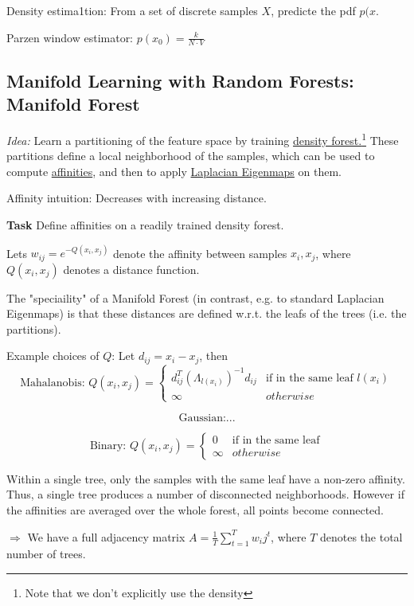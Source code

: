 \documentclass{scrartcl}
\begin{document}
\bigbreak

Density estima1tion: From a set of discrete samples \(X\), predicte the pdf \(p(x\).

Parzen window estimator: \(p(x_0) = \frac{k}{N \cdot V}\)

\subsection{Manifold Learning with Random Forests: Manifold Forest}
\textit{Idea:} Learn a partitioning of the feature space by training \underline{density forest.}\footnote{Note that we don't explicitly use the density} These partitions define a local neighborhood of the samples, which can be used to compute \underline{affinities}, and then to apply \underline{Laplacian Eigenmaps} on them.

Affinity intuition: Decreases with increasing distance.

\bigbreak

\textbf{Task} Define affinities on a readily trained density forest.

Lets \(w_{ij} = e^{-Q(x_i, x_j)}\) denote the affinity between samples \(x_i,x_j\), where \(Q(x_i, x_j)\) denotes a distance function.

The "speciaility" of a Manifold Forest (in contrast, e.g. to standard Laplacian Eigenmaps) is that these distances are defined w.r.t. the leafs of the trees (i.e. the partitions).

Example choices of \(Q\): Let \(d_{ij} = x_i - x_j\), then
\[\text{Mahalanobis: } Q(x_i, x_j) = \begin{cases} d_{ij}^T(\Lambda_{l(x_i)})^{-1} d_{ij} & \text{if in the same leaf } l(x_i) \\ \infty & otherwise \end{cases}\]

\[\text{Gaussian:} ...\]

\[\text{Binary: } Q(x_i, x_j) = \begin{cases} 0 & \text{if in the same leaf} \\ \infty & otherwise \end{cases}\]

Within a single tree, only the samples with the same leaf have a non-zero affinity. Thus, a single tree produces a number of disconnected neighborhoods.
However if the affinities are averaged over the whole forest, all points become connected.

\(\Rightarrow\) We have a full adjacency matrix \(A = \frac{1}{T} \sum_{t=1}^T w_ij^t\), where \(T\) denotes the total number of trees.
\end{document}
